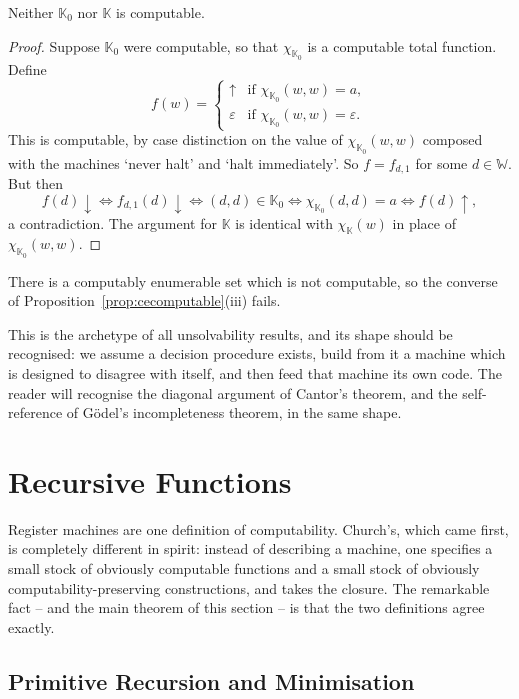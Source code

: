 \documentclass[a4paper]{scrartcl}
\newcommand{\WW}{\mathbb{W}}
\newcommand{\KK}{\mathbb{K}}
\newcommand{\eps}{\varepsilon}
\begin{document}
\begin{theorem}\label{thm:halting}
	Neither $\KK_0$ nor $\KK$ is computable.
\end{theorem}

\begin{proof}
	Suppose $\KK_0$ were computable, so that $\chi_{\KK_0}$ is a computable total function. Define
	$$f(w) = \begin{cases}\uparrow & \text{if } \chi_{\KK_0}(w,w) = a, \\ \eps & \text{if } \chi_{\KK_0}(w,w) = \eps.\end{cases}$$
	This is computable, by case distinction on the value of $\chi_{\KK_0}(w,w)$ composed with the machines `never halt' and `halt immediately'. So $f = f_{d,1}$ for some $d \in \WW$. But then
	$$f(d)\!\downarrow \iff f_{d,1}(d)\!\downarrow \iff (d,d) \in \KK_0 \iff \chi_{\KK_0}(d,d) = a \iff f(d)\!\uparrow,$$
	a contradiction. The argument for $\KK$ is identical with $\chi_{\KK}(w)$ in place of $\chi_{\KK_0}(w,w)$.
\end{proof}

\begin{corollary}
	There is a computably enumerable set which is not computable, so the converse of Proposition~\ref{prop:cecomputable}(iii) fails.
\end{corollary}

This is the archetype of all unsolvability results, and its shape should be recognised: we assume a decision procedure exists, build from it a machine which is designed to disagree with itself, and then feed that machine its own code. The reader will recognise the diagonal argument of Cantor's theorem, and the self-reference of G\"odel's incompleteness theorem, in the same shape.

\section{Recursive Functions}\label{sec:recursive}

Register machines are one definition of computability. Church's, which came first, is completely different in spirit: instead of describing a machine, one specifies a small stock of obviously computable functions and a small stock of obviously computability-preserving constructions, and takes the closure. The remarkable fact -- and the main theorem of this section -- is that the two definitions agree exactly.

\subsection{Primitive Recursion and Minimisation}
\end{document}
